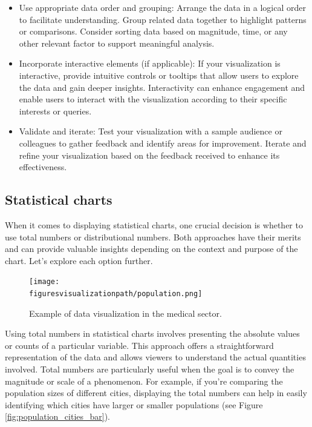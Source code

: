 \documentclass[10pt]{extarticle}
\newcommand{\<}{\langle}
\renewcommand{\>}{\rangle}
\newcommand{\figuresvisualizationpath}{D:/projecten/syntra/git-repos/data-science-syntra-ab/04 data visualizatie/figures}
\theoremstyle{mystyle}{\newtheorem*{remark}{Remark}}
\theoremstyle{mystyle}{\newtheorem*{remarks}{Remarks}}
\theoremstyle{mystyle}{\newtheorem*{example}{Example}}
\theoremstyle{mystyle}{\newtheorem*{examples}{Examples}}
\theoremstyle{definition}{\newtheorem*{exercise}{Exercise}}
\theoremstyle{warn}
\begin{document}
\begin{itemize}
\item Use appropriate data order and grouping: Arrange the data in a logical order to facilitate understanding. Group related data together to highlight patterns or comparisons. Consider sorting data based on magnitude, time, or any other relevant factor to support meaningful analysis.

\item Incorporate interactive elements (if applicable): If your visualization is interactive, provide intuitive controls or tooltips that allow users to explore the data and gain deeper insights. Interactivity can enhance engagement and enable users to interact with the visualization according to their specific interests or queries.

\item Validate and iterate: Test your visualization with a sample audience or colleagues to gather feedback and identify areas for improvement. Iterate and refine your visualization based on the feedback received to enhance its effectiveness.
\end{itemize}

\subsection{Statistical charts}
When it comes to displaying statistical charts, one crucial decision is whether to use total numbers or distributional numbers. Both approaches have their merits and can provide valuable insights depending on the context and purpose of the chart. Let's explore each option further.

\begin{figure}
\center
\texttt{[image: \\figuresvisualizationpath/population.png]} 
\caption{Example of data visualization in the medical sector.}\label{fig:datavispopulation_cities_bar}
\end{figure}
Using total numbers in statistical charts involves presenting the absolute values or counts of a particular variable. This approach offers a straightforward representation of the data and allows viewers to understand the actual quantities involved. Total numbers are particularly useful when the goal is to convey the magnitude or scale of a phenomenon. For example, if you're comparing the population sizes of different cities, displaying the total numbers can help in easily identifying which cities have larger or smaller populations (see Figure \ref{fig:population_cities_bar}).
\end{document}
